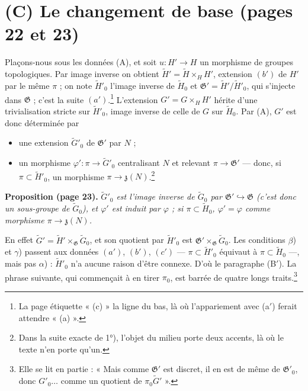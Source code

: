 \documentclass[11pt,a4paper]{article}
\begin{document}
\section*{(C) Le changement de base (pages 22 et 23)}

Plaçons-nous sous les données (A), et soit $u : H' \to H$ un morphisme de
groupes topologiques. Par image inverse on obtient $\widetilde{H}' =
\widetilde{H} \times_H H'$, extension $(b')$ de $H'$ par le même $\pi$ ; on
note $\widetilde{H}'_0$ l'image inverse de $\widetilde{H}_0$ et
$\mathfrak{G}' = \widetilde{H}'/\widetilde{H}'_0$, qui s'injecte dans
$\mathfrak{G}$ ; c'est la suite $(a')$.\footnote{La page étiquette « (c) » la
ligne du bas, là où l'appariement avec (a$'$) ferait attendre « (a) ».}
L'extension $G' = G \times_H H'$ hérite d'une trivialisation stricte sur
$\widetilde{H}'_0$, image inverse de celle de $G$ sur $\widetilde{H}_0$. Par
(A), $G'$ est donc déterminée par
\begin{itemize}
\item[1°)] une extension $\widetilde{G}'_0$ de $\mathfrak{G}'$ par $N$ ;
\item[2°)] un morphisme $\varphi' : \pi \to \widetilde{G}'_0$ centralisant
$N$ et relevant $\pi \to \mathfrak{G}'$ — donc, si $\pi \subset
\widetilde{H}'_0$, un morphisme $\pi \to \mathfrak{z}(N)$.\footnote{Dans la
suite exacte de 1°), l'objet du milieu porte deux accents, là où le texte
n'en porte qu'un.}
\end{itemize}

\textbf{Proposition (page 23).} \emph{$\widetilde{G}'_0$ est l'image inverse
de $\widetilde{G}_0$ par $\mathfrak{G}' \hookrightarrow \mathfrak{G}$ (c'est
donc un sous-groupe de $\widetilde{G}_0$), et $\varphi'$ est induit par
$\varphi$ ; si $\pi \subset \widetilde{H}_0$, $\varphi' = \varphi$ comme
morphisme $\pi \to \mathfrak{z}(N)$.}

En effet $\widetilde{G}' = \widetilde{H}' \times_{\mathfrak{G}}
\widetilde{G}_0$, et son quotient par $\widetilde{H}'_0$ est
$\mathfrak{G}' \times_{\mathfrak{G}} \widetilde{G}_0$. Les conditions
$\beta$) et $\gamma$) passent aux données $(a')$, $(b')$, $(c')$ — $\pi
\subset \widetilde{H}'_0$ équivaut à $\pi \subset \widetilde{H}_0$ —, mais
pas $\alpha$) : $\widetilde{H}'_0$ n'a aucune raison d'être connexe. D'où le
paragraphe (B$'$). La phrase suivante, qui commençait à en tirer $\pi_0$, est
barrée de quatre longs traits.\footnote{Elle se lit en partie : « Mais comme
$\mathfrak{G}'$ est discret, il en est de même de $\mathfrak{G}'_0$, donc
$G'_0 \dots$ comme un quotient de $\pi_0 \widetilde{G}'$ ».}
\end{document}
